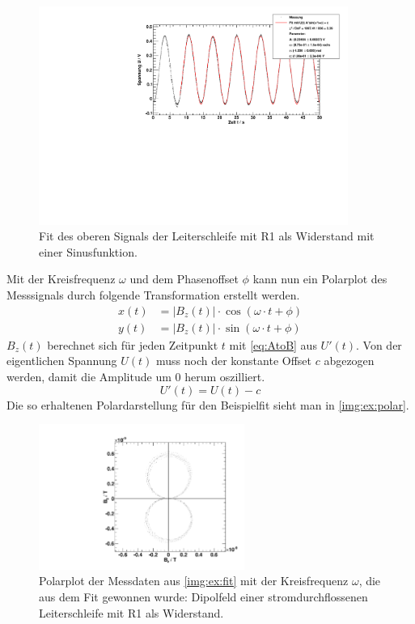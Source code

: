 \begin{figure}[H]
\begin{center}
  \includegraphics[width=0.9\textwidth]{../img/fit_Spule_R1.pdf}
  \caption{Fit des oberen Signals der Leiterschleife mit R1 als Widerstand mit einer Sinusfunktion.}
  \label{img:ex:fit}
\end{center}
\end{figure}

Mit der Kreisfrequenz $\omega$ und dem Phasenoffset $\phi$ kann nun ein Polarplot des Messsignals durch folgende Transformation erstellt werden.
\begin{equation}
  \label{eq:polartransform}
  \begin{split}
    x(t) &= |B_z(t)| \cdot \cos(\omega \cdot t + \phi) \\
    y(t) &= |B_z(t)| \cdot \sin(\omega \cdot t + \phi)
  \end{split}
\end{equation}
$B_z(t)$ berechnet sich für jeden Zeitpunkt $t$ mit \autoref{eq:AtoB} aus $U'(t)$. Von der eigentlichen Spannung $U(t)$ muss noch der 
konstante Offset $c$ abgezogen werden, damit die Amplitude um 0 herum oszilliert.
\begin{equation}
  U'(t) = U(t) - c
\end{equation}
Die so erhaltenen Polardarstellung für den Beispielfit sieht man in \autoref{img:ex:polar}.
\begin{figure}[H]
\begin{center}
  \includegraphics[width=0.6\textwidth]{../img/polar_Spule_R1.pdf}
  \caption{Polarplot der Messdaten aus \autoref{img:ex:fit} mit der Kreisfrequenz $\omega$,
  die aus dem Fit gewonnen wurde: Dipolfeld einer stromdurchflossenen Leiterschleife mit R1 als Widerstand.}
  \label{img:ex:polar}
\end{center}
\end{figure}

